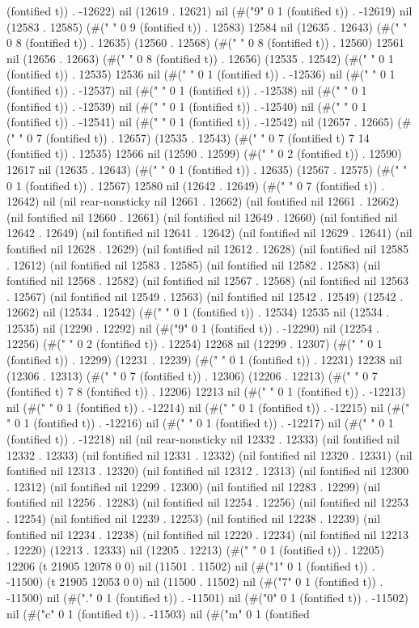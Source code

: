 (fontified t)) . -12622) nil (12619 . 12621) nil (#("9" 0 1 (fontified t)) . -12619) nil (12583 . 12585) (#("		       " 0 9 (fontified t)) . 12583) 12584 nil (12635 . 12643) (#("		      " 0 8 (fontified t)) . 12635) (12560 . 12568) (#("		      " 0 8 (fontified t)) . 12560) 12561 nil (12656 . 12663) (#("		      " 0 8 (fontified t)) . 12656) (12535 . 12542) (#("	" 0 1 (fontified t)) . 12535) 12536 nil (#("	" 0 1 (fontified t)) . -12536) nil (#(" " 0 1 (fontified t)) . -12537) nil (#(" " 0 1 (fontified t)) . -12538) nil (#(" " 0 1 (fontified t)) . -12539) nil (#(" " 0 1 (fontified t)) . -12540) nil (#(" " 0 1 (fontified t)) . -12541) nil (#(" " 0 1 (fontified t)) . -12542) nil (12657 . 12665) (#("		     " 0 7 (fontified t)) . 12657) (12535 . 12543) (#("	             " 0 7 (fontified t) 7 14 (fontified t)) . 12535) 12566 nil (12590 . 12599) (#("	 " 0 2 (fontified t)) . 12590) 12617 nil (12635 . 12643) (#("	" 0 1 (fontified t)) . 12635) (12567 . 12575) (#("	" 0 1 (fontified t)) . 12567) 12580 nil (12642 . 12649) (#("       " 0 7 (fontified t)) . 12642) nil (nil rear-nonsticky nil 12661 . 12662) (nil fontified nil 12661 . 12662) (nil fontified nil 12660 . 12661) (nil fontified nil 12649 . 12660) (nil fontified nil 12642 . 12649) (nil fontified nil 12641 . 12642) (nil fontified nil 12629 . 12641) (nil fontified nil 12628 . 12629) (nil fontified nil 12612 . 12628) (nil fontified nil 12585 . 12612) (nil fontified nil 12583 . 12585) (nil fontified nil 12582 . 12583) (nil fontified nil 12568 . 12582) (nil fontified nil 12567 . 12568) (nil fontified nil 12563 . 12567) (nil fontified nil 12549 . 12563) (nil fontified nil 12542 . 12549) (12542 . 12662) nil (12534 . 12542) (#(" " 0 1 (fontified t)) . 12534) 12535 nil (12534 . 12535) nil (12290 . 12292) nil (#("9" 0 1 (fontified t)) . -12290) nil (12254 . 12256) (#("	 " 0 2 (fontified t)) . 12254) 12268 nil (12299 . 12307) (#("	" 0 1 (fontified t)) . 12299) (12231 . 12239) (#("	" 0 1 (fontified t)) . 12231) 12238 nil (12306 . 12313) (#("       " 0 7 (fontified t)) . 12306) (12206 . 12213) (#("	       " 0 7 (fontified t) 7 8 (fontified t)) . 12206) 12213 nil (#(" " 0 1 (fontified t)) . -12213) nil (#(" " 0 1 (fontified t)) . -12214) nil (#(" " 0 1 (fontified t)) . -12215) nil (#(" " 0 1 (fontified t)) . -12216) nil (#(" " 0 1 (fontified t)) . -12217) nil (#(" " 0 1 (fontified t)) . -12218) nil (nil rear-nonsticky nil 12332 . 12333) (nil fontified nil 12332 . 12333) (nil fontified nil 12331 . 12332) (nil fontified nil 12320 . 12331) (nil fontified nil 12313 . 12320) (nil fontified nil 12312 . 12313) (nil fontified nil 12300 . 12312) (nil fontified nil 12299 . 12300) (nil fontified nil 12283 . 12299) (nil fontified nil 12256 . 12283) (nil fontified nil 12254 . 12256) (nil fontified nil 12253 . 12254) (nil fontified nil 12239 . 12253) (nil fontified nil 12238 . 12239) (nil fontified nil 12234 . 12238) (nil fontified nil 12220 . 12234) (nil fontified nil 12213 . 12220) (12213 . 12333) nil (12205 . 12213) (#(" " 0 1 (fontified t)) . 12205) 12206 (t 21905 12078 0 0) nil (11501 . 11502) nil (#("1" 0 1 (fontified t)) . -11500) (t 21905 12053 0 0) nil (11500 . 11502) nil (#("7" 0 1 (fontified t)) . -11500) nil (#("." 0 1 (fontified t)) . -11501) nil (#("0" 0 1 (fontified t)) . -11502) nil (#("c" 0 1 (fontified t)) . -11503) nil (#("m" 0 1 (fontified 